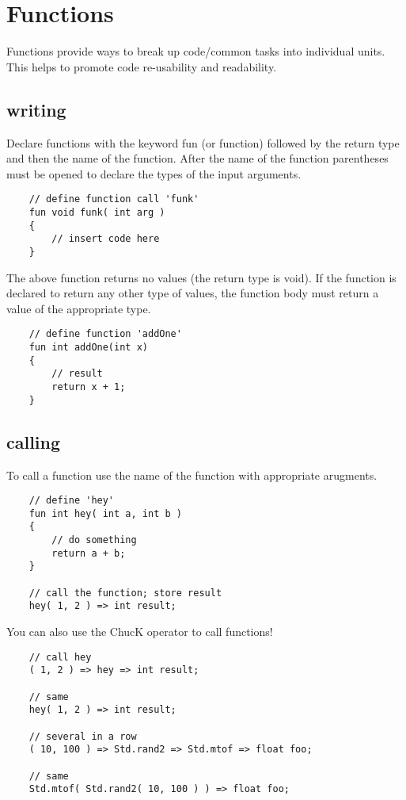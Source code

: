 \chapter{Functions}

Functions provide ways to break up code/common tasks into individual units. This helps to promote code re-usability and readability.

\section{writing}

Declare functions with the keyword fun (or  function) followed by the return type and then the name of the function. After the name of the function parentheses must be opened to declare the types of the input arguments.
\begin{verbatim}
    // define function call 'funk'
    fun void funk( int arg )
    {
        // insert code here
    }
\end{verbatim}

The above function returns no values (the return type is void). If the function is declared to return any other type of values, the function body must return a value of the appropriate type.
\begin{verbatim}
    // define function 'addOne'
    fun int addOne(int x)
    {
        // result
        return x + 1;
    }
\end{verbatim}
 
\section{calling}

To call a function use the name of the function with appropriate arugments.
\begin{verbatim}
    // define 'hey'
    fun int hey( int a, int b )
    {
        // do something
        return a + b;
    }

    // call the function; store result
    hey( 1, 2 ) => int result;
\end{verbatim}

You can also use the ChucK operator to call functions!
\begin{verbatim}
    // call hey
    ( 1, 2 ) => hey => int result;

    // same
    hey( 1, 2 ) => int result;

    // several in a row
    ( 10, 100 ) => Std.rand2 => Std.mtof => float foo;

    // same
    Std.mtof( Std.rand2( 10, 100 ) ) => float foo;
\end{verbatim}
 
